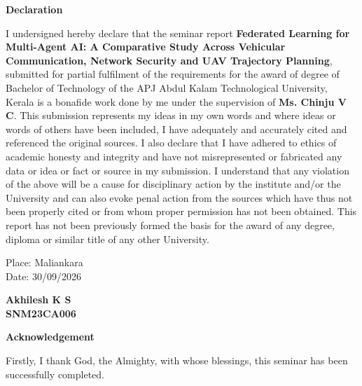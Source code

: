 \documentclass[12pt,a4paper,final]{extreport}
\begin{document}
\newpage

\thispagestyle{empty}
\begin{center}
\begin{huge}
\textbf{Declaration}
\end{huge}
\end{center}

\vskip0.5cm
I undersigned hereby declare that the seminar report \textbf{Federated Learning for Multi-Agent AI: A Comparative Study Across Vehicular Communication, Network Security and UAV Trajectory Planning}, submitted for partial fulfilment of the requirements for the award of degree of Bachelor of Technology of the APJ Abdul Kalam Technological University, Kerala is a bonafide work done by me under the supervision of \textbf{Ms. Chinju V C}. This submission represents my ideas in my own words and where ideas or words of others have been included, I have adequately and accurately cited and referenced the original sources. I also declare that I have adhered to ethics of academic honesty and integrity and have not misrepresented or fabricated any data or idea or fact or source in my submission. I understand that any violation of the above will be a cause for disciplinary action by the institute and/or the University and can also evoke penal action from the sources which have thus not been properly cited or from whom proper permission has not been obtained. This report has not been previously formed the basis for the award of any degree, diploma or similar title of any other University.

\vspace{2cm}
\noindent
\begin{minipage}[t]{0.5\textwidth}
Place: Maliankara\\
Date: 30/09/2026
\end{minipage}%
\hfill
\begin{minipage}[t]{0.4\textwidth}
\centering
\textbf{Akhilesh K S}\\
\textbf{SNM23CA006}
\end{minipage}

\newpage
\thispagestyle{plain}
\setcounter{page}{1}
\begin{center}
\begin{huge}
\textbf{Acknowledgement}
\end{huge}
\end{center}
\vskip1cm
\hspace*{1 cm} Firstly, I thank God, the Almighty, with whose blessings, this seminar has been successfully completed.
\end{document}
